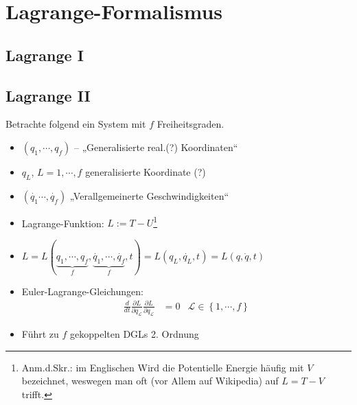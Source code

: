 \section{Lagrange-Formalismus}
\subsection{Lagrange I}
\subsection{Lagrange II}
Betrachte folgend ein System mit $f$ Freiheitsgraden.
\begin{itemize}
\item $(q_1,\cdots,q_f)$ – „Generalisierte
  real.(?) Koordinaten“
\item ${q_L}$, $L=1,\cdots,f$ generalisierte Koordinate (?)
\item $(\dot{q_1}\cdots,\dot{q_f})$ „Verallgemeinerte
  Geschwindigkeiten“
\item Lagrange-Funktion: $L := T - U$\footnote{Anm.d.Skr.: im
    Englischen Wird die Potentielle Energie häufig mit $V$ bezeichnet,
    weswegen man oft (vor Allem auf Wikipedia) auf $L=T-V$ trifft.}
\item
  $L = L(\underbrace{q_1, \cdots, q_f}_f, \underbrace{\dot{q_1},
    \cdots, \dot{q_f}}_{f}, t) = L(q_L, \dot{q_L}, t) = L(q, \dot{q},
  t)$
\item Euler-Lagrange-Gleichungen:
  \begin{align*} \frac{d}{dt}\frac{\partial L}{\partial
      \dot{q_{\mathcal{L}}}} \frac{\partial L}{\partial
      q_{\mathcal{L}}} &= 0 & \mathcal{L} \in \left\{ 1,\cdots,f
    \right\}
  \end{align*}
\item Führt zu $f$ gekoppelten DGLs 2. Ordnung
\end{itemize}

